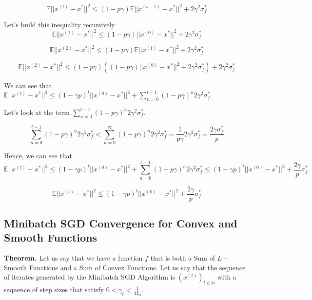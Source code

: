 \begin{equation}
    \mathbb{E}||x^{(t)} - x^*||^2  \leq (1 - p \gamma) \mathbb{E}||x^{(t - 1)} - x^*||^2 + 2\gamma^2 \sigma_f^*
\end{equation}

\noindent Let's build this inequality recursively
\begin{equation}
    \mathbb{E}||x^{(1)} - x^*||^2  \leq (1 - p \gamma) ||x^{(0)} - x^*||^2 + 2\gamma^2 \sigma_f^*
\end{equation}

\begin{equation}
    \mathbb{E}||x^{(2)} - x^*||^2  \leq (1 - p \gamma) \mathbb{E}||x^{(1)} - x^*||^2 + 2\gamma^2 \sigma_f^*
\end{equation}

\begin{equation}
    \mathbb{E}||x^{(2)} - x^*||^2  \leq (1 - p \gamma) ((1 - p \gamma) ||x^{(0)} - x^*||^2 + 2\gamma^2 \sigma_f^*) + 2\gamma^2 \sigma_f^*
\end{equation}

\noindent We can see that $\mathbb{E}||x^{(t)} - x^*||^2 \leq (1 - \gamma p)^t ||x^{(0)} - x^*||^2 + \sum_{n=0}^{t - 1} (1 - p\gamma)^n 2\gamma^2 \sigma_f^*$

\noindent Let's look at the term $\sum_{n=0}^{t - 1} (1 - p\gamma)^n 2\gamma^2 \sigma_f^*$. 

\begin{equation}
    \sum_{n=0}^{t - 1} (1 - p\gamma)^n 2\gamma^2 \sigma_f^* < \sum_{n=0}^{\infty} (1 - p\gamma)^n 2\gamma^2 \sigma_f^* = \frac{1}{p\gamma} 2\gamma^2 \sigma_f^* = \frac{2\gamma \sigma_f^*}{p}
\end{equation}

Hence, we can see that
\begin{equation}
    \mathbb{E}||x^{(t)} - x^*||^2 \leq (1 - \gamma p)^t ||x^{(0)} - x^*||^2 + \sum_{n=0}^{t - 1} (1 - p\gamma)^n 2\gamma^2 \sigma_f^* \leq (1 - \gamma p)^t ||x^{(0)} - x^*||^2 + \frac{2 \gamma}{p} \sigma_f^*
\end{equation}

\begin{equation}
    \mathbb{E}||x^{(t)} - x^*||^2 \leq (1 - \gamma p)^t ||x^{(0)} - x^*||^2 + \frac{2 \gamma}{p} \sigma_f^*
\end{equation}

\subsection{Minibatch SGD Convergence for Convex and Smooth Functions}
\noindent \textbf{Theorem.} Let us say that we have a function $f$ that is both a Sum of $L-$Smooth Functions and a Sum of Convex Functions. Let us say that the sequence of iterates generated by the Minibatch SGD Algorithm is $(x^{(t)})_{t \in \mathbb{N}}$ with a sequence of step sizes that satisfy $0 < \gamma_t < \frac{1}{4L_{b}}$. 

